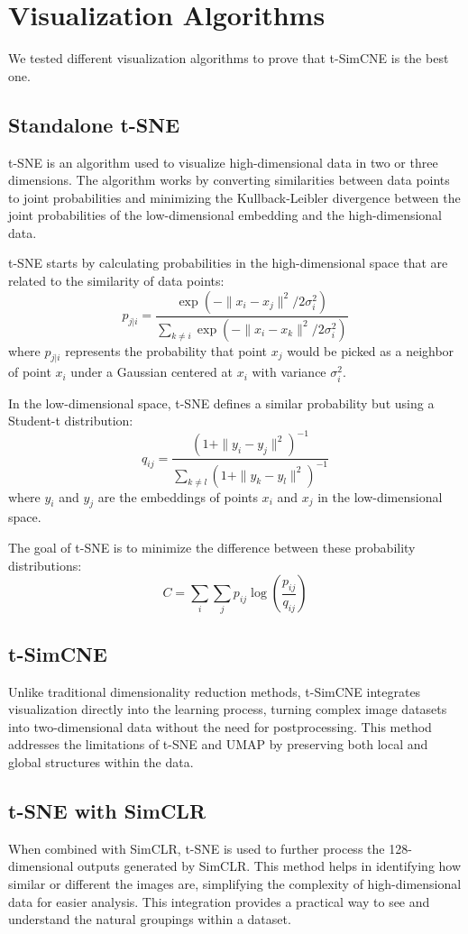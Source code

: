 \section{Visualization Algorithms}
We tested different visualization algorithms to prove that t-SimCNE is the best one.

\subsection{Standalone t-SNE}

t-SNE is an algorithm used to visualize high-dimensional data in two or three dimensions. The algorithm works by converting similarities between data points to joint probabilities and minimizing the Kullback-Leibler divergence between the joint probabilities of the low-dimensional embedding and the high-dimensional data.

t-SNE starts by calculating probabilities in the high-dimensional space that are related to the similarity of data points:
\[
p_{j|i} = \frac{\exp(-\|x_i - x_j\|^2 / 2\sigma_i^2)}{\sum_{k \neq i} \exp(-\|x_i - x_k\|^2 / 2\sigma_i^2)}
\]
where \(p_{j|i}\) represents the probability that point \(x_j\) would be picked as a neighbor of point \(x_i\) under a Gaussian centered at \(x_i\) with variance \(\sigma_i^2\).

In the low-dimensional space, t-SNE defines a similar probability but using a Student-t distribution:
\[
q_{ij} = \frac{(1 + \|y_i - y_j\|^2)^{-1}}{\sum_{k \neq l} (1 + \|y_k - y_l\|^2)^{-1}}
\]
where \(y_i\) and \(y_j\) are the embeddings of points \(x_i\) and \(x_j\) in the low-dimensional space.

The goal of t-SNE is to minimize the difference between these probability distributions:
\[
C = \sum_i \sum_j p_{ij} \log\left(\frac{p_{ij}}{q_{ij}}\right)
\]

\subsection{t-SimCNE}
Unlike traditional dimensionality reduction methods, t-SimCNE integrates visualization directly into the learning process, turning complex image datasets into two-dimensional data without the need for postprocessing. This method addresses the limitations of t-SNE and UMAP by preserving both local and global structures within the data.

\subsection{t-SNE with SimCLR}
When combined with SimCLR, t-SNE is used to further process the 128-dimensional outputs generated by SimCLR. This method helps in identifying how similar or different the images are, simplifying the complexity of high-dimensional data for easier analysis. This integration provides a practical way to see and understand the natural groupings within a dataset.


